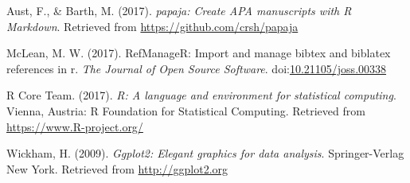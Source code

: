 \documentclass[man]{apa6}
\theoremstyle{definition}
\theoremstyle{definition}
\theoremstyle{definition}
\theoremstyle{remark}
\begin{document}
\hypertarget{ref-R-papaja}{}
Aust, F., \& Barth, M. (2017). \emph{papaja: Create APA manuscripts with
R Markdown}. Retrieved from \url{https://github.com/crsh/papaja}

\hypertarget{ref-R-RefManageR}{}
McLean, M. W. (2017). RefManageR: Import and manage bibtex and biblatex
references in r. \emph{The Journal of Open Source Software}.
doi:\href{https://doi.org/10.21105/joss.00338}{10.21105/joss.00338}

\hypertarget{ref-R-base}{}
R Core Team. (2017). \emph{R: A language and environment for statistical
computing}. Vienna, Austria: R Foundation for Statistical Computing.
Retrieved from \url{https://www.R-project.org/}

\hypertarget{ref-R-ggplot2}{}
Wickham, H. (2009). \emph{Ggplot2: Elegant graphics for data analysis}.
Springer-Verlag New York. Retrieved from \url{http://ggplot2.org}
\end{document}
